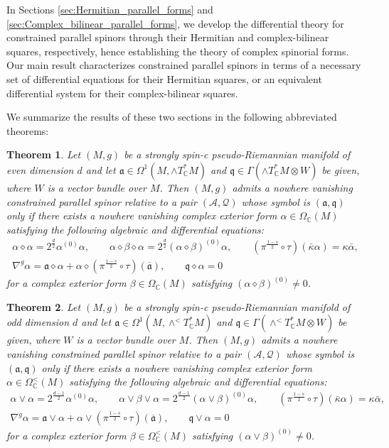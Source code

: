 \documentclass[10pt,a4paper,twoside,reqno]{amsart}
\theoremstyle{plain}
\newtheorem{thm}{Theorem}[section]
\theoremstyle{definition}
\theoremstyle{remark}
\def\C{\mathbb{C}}
\def\cQ{\mathcal{Q}}
\def\fra{\mathfrak{a}}
\def\frq{\mathfrak{q}}
\def\cA{\mathcal{A}}
\begin{document}
In Sections \ref{sec:Hermitian_parallel_forms} and \ref{sec:Complex_bilinear_parallel_forms}, we develop the differential theory for constrained parallel spinors through their Hermitian and complex-bilinear squares, respectively, hence establishing the theory of complex spinorial forms. Our main result characterizes constrained parallel spinors in terms of a necessary set of differential equations for their Hermitian squares, or an equivalent differential system for their complex-bilinear squares.\medskip

We summarize the results of these two sections in the following abbreviated theorems:

\begin{thm} 
\label{thm:hermitianeven}
Let $(M,g)$ be a strongly spin-c pseudo-Riemannian manifold of even dimension $d$ and let $\fra\in\Omega^1(M,\wedge T^*_\C M)$ and $\frq\in\Gamma(\wedge T^*_\C M\otimes W)$ be given, where $W$ is a vector bundle over $M$. Then $(M,g)$ admits a nowhere vanishing constrained parallel spinor relative to a pair $(\cA,\cQ)$ whose symbol is $(\fra,\frq)$ only if there exists a nowhere vanishing complex exterior form $\alpha\in\Omega_\C(M)$ satisfying the following algebraic and differential equations: 
\begin{gather*}
\alpha\diamond\alpha = 2^{\frac{d}{2}}\alpha^{(0)}\alpha,\qquad \alpha \diamond \beta \diamond \alpha=2^{\frac{d}{2}}(\alpha\diamond\beta)^{(0)}\alpha,\qquad(\pi^{\frac{1-s}{2}}\circ\tau)(\bar\kappa\alpha) = \kappa \bar{\alpha},\\
\nabla^g\alpha=\fra\diamond\alpha+\alpha\diamond(\pi^{\frac{1-s}{2}}\circ\tau)(\overline{\fra}),\qquad\frq\diamond\alpha=0
\end{gather*} 
for a complex exterior form $\beta\in\Omega_\C(M)$ satisfying $(\alpha\diamond\beta)^{(0)}\neq0$.
\end{thm}

\begin{thm}
\label{thm:hermitianodd}
Let $(M,g)$ be a strongly spin-c pseudo-Riemannian manifold of odd dimension $d$ and let $\fra\in\Omega^1(M,\wedge^< T^*_\C M)$ and $\frq\in\Gamma(\wedge^< T^*_\C M\otimes W)$ be given, where $W$ is a vector bundle over $M$. Then $(M,g)$ admits a nowhere vanishing constrained parallel spinor relative to a pair $(\cA,\cQ)$ whose symbol is $(\fra,\frq)$ only if there exists a nowhere vanishing complex exterior form $\alpha\in\Omega^<_\C(M)$ satisfying the following algebraic and differential equations: 
\begin{gather*}
\alpha\vee\alpha = 2^{\frac{d-1}{2}}\alpha^{(0)}\alpha,\qquad \alpha\vee\beta\vee\alpha=2^{\frac{d-1}{2}}(\alpha\vee\beta)^{(0)}\alpha,\qquad(\pi^{\frac{1-s}{2}}\circ\tau)(\bar\kappa\alpha) = \kappa \bar{\alpha},\\
\nabla^g\alpha=\fra\vee\alpha+\alpha\vee(\pi^{\frac{1-s}{2}}\circ\tau)(\overline{\fra}),\qquad\frq\vee\alpha=0
\end{gather*} 
for a complex exterior form $\beta\in\Omega^<_\C(M)$ satisfying $(\alpha\vee\beta)^{(0)}\neq0$.
\end{thm}
\end{document}

